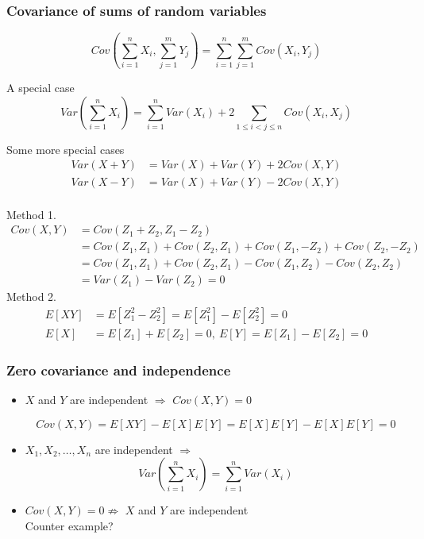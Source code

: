 \documentclass[slidestop,compress,mathserif]{beamer}
\begin{document}
\begin{frame}\frametitle{Covariance of sums of random variables}
\[Cov\left(\sum_{i=1}^n X_i, \sum_{j = 1}^m Y_j  \right) = \sum_{i=1}^n \sum_{j = 1}^m Cov\left(X_i, Y_j  \right)\]

A special case
\[Var\left(\sum_{i=1}^n X_i \right) = \sum_{i=1}^n Var(X_i) + 2\sum_{1 \leq i < j \leq n} Cov(X_i, X_j)\]

Some more special cases
\begin{align*}
Var(X+Y) &= Var(X)+Var(Y)+2Cov(X,Y)\\
Var(X-Y) &= Var(X)+Var(Y)-2Cov(X,Y)\\
\end{align*}


\end{frame}

\begin{frame}%

\pause
{\small{
Method 1.
\begin{align*}
Cov(X, Y) & = Cov(Z_1 + Z_2, Z_1 - Z_2)\\
	& = Cov(Z_1, Z_1) + Cov(Z_2, Z_1) + Cov(Z_1, - Z_2) + Cov(Z_2, -Z_2)\\
	& = Cov(Z_1, Z_1) + Cov(Z_2, Z_1) - Cov(Z_1,  Z_2) - Cov(Z_2, Z_2)\\
	& = Var(Z_1) - Var(Z_2) = 0
\end{align*}
\pause
Method 2.
\begin{align*}
E[XY] & = E[Z_1^2 - Z_2^2] = E[Z_1^2] - E[Z_2^2] = 0 \\
E[X]   & = E[Z_1] + E[Z_2] = 0, ~ E[Y] = E[Z_1] - E[Z_2] =0
\end{align*}
}}
\end{frame}


\begin{frame}\frametitle{Zero covariance and independence}

\begin{itemize}
\item $X$ and $Y$ are independent $ \Longrightarrow$ $Cov(X,Y) = 0$

\[ Cov(X,Y) = E[XY]- E[X]E[Y] = E[X]E[Y] - E[X]E[Y] = 0\] 
\item $X_1, X_2, \ldots, X_n$ are independent $ \Longrightarrow$
\[Var\left(\sum_{i=1}^n X_i \right) = \sum_{i=1}^n Var(X_i)\]

\item $Cov(X,Y) = 0 \not\Longrightarrow$  $X$ and $Y$ are independent\\
Counter example?

\end{itemize}

\end{frame}
\end{document}
